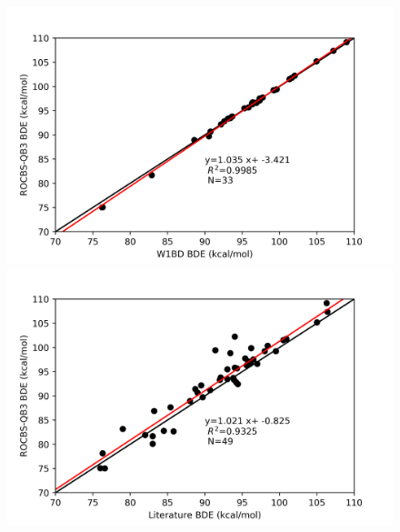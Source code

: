 \begin{figure}
\centering
\begin{minipage}{8cm}
  \centering
  \includegraphics[width=\textwidth]{figures/w1bd-rocbsqb3}
\end{minipage}%
\begin{minipage}{8cm}
  \centering
  \includegraphics[width=\textwidth]{figures/lit-rocbsqb3}
\end{minipage}
\end{figure}

